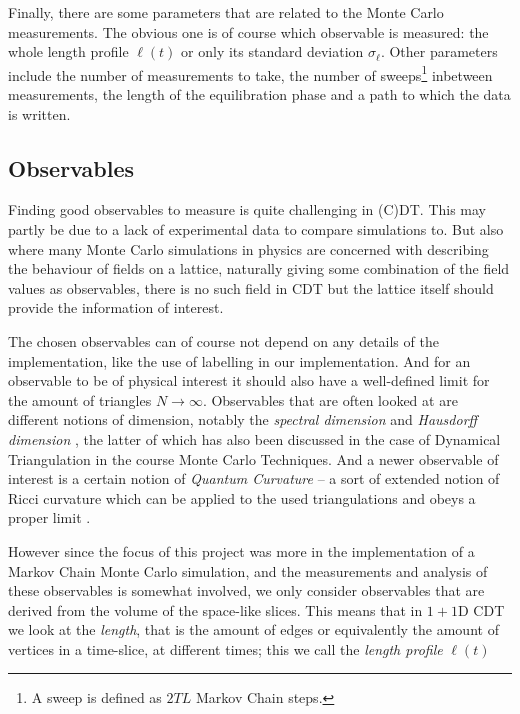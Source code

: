Finally, there are some parameters that are related to the Monte Carlo measurements. The obvious one is of course which observable is measured: the whole length profile $\ell(t)$ or only its standard deviation $\sigma_\ell$. Other parameters include the number of measurements to take, the number of sweeps\footnote{A sweep is defined as $2 T L$ Markov Chain steps.} inbetween measurements, the length of the equilibration phase and a path to which the data is written.

\subsection{Observables} \label{sec:observables}
Finding good observables to measure is quite challenging in (C)DT. This may partly be due to a lack of experimental data to compare simulations to.
But also where many Monte Carlo simulations in physics are concerned with describing the behaviour of fields on a lattice, naturally giving some combination of the field values as observables,
there is no such field in CDT but the lattice itself should provide the information of interest.

The chosen observables can of course not depend on any details of the implementation, like the use of labelling in our implementation.
And for an observable to be of physical interest it should also have a well-defined limit for the amount of triangles $N \rightarrow \infty$.
Observables that are often looked at are different notions of dimension, notably the \emph{spectral dimension} \cite{2012} and \emph{Hausdorff dimension} \cite{1998, 2012}, the latter of which has also been discussed in the case of Dynamical Triangulation in the course Monte Carlo Techniques. And a newer observable of interest is a certain notion of \emph{Quantum Curvature} -- a sort of extended notion of Ricci curvature which can be applied to the used triangulations and obeys a proper limit \cite{brunekreef2021}.

However since the focus of this project was more in the implementation of a Markov Chain Monte Carlo simulation, and the measurements and analysis of these observables is somewhat involved, we only consider observables that are derived from the volume of the space-like slices.
This means that in $1 + 1$D CDT we look at the \emph{length}, that is the amount of edges or equivalently the amount of vertices in a time-slice, at different times; this we call the \emph{length profile} $\ell(t)$

